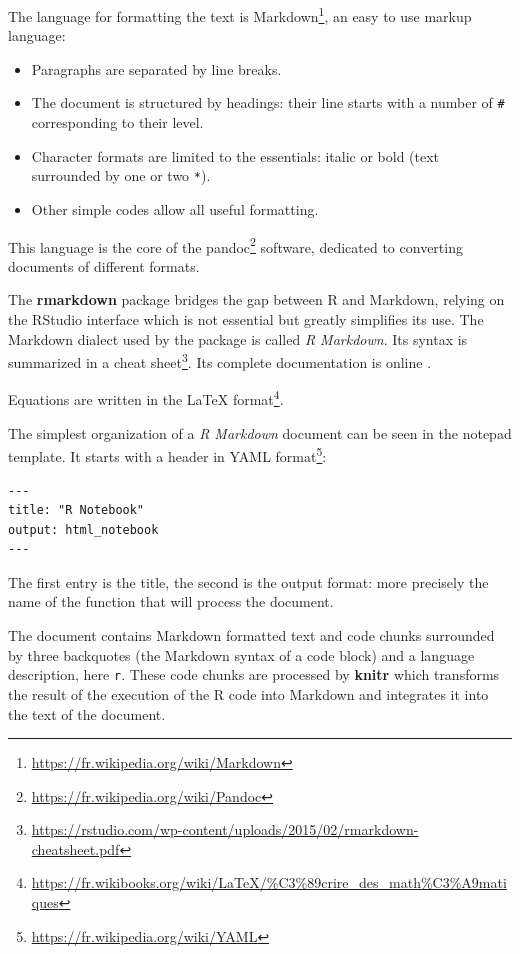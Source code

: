\documentclass[
  12pt,
  american,
  a4paper,
  extrafontsizes,onecolumn,openright
  ]{memoir}
\providecommand{\tightlist}{%
  \setlength{\itemsep}{0pt}\setlength{\parskip}{0pt}}
\newlength{\rf}
\begin{document}
The language for formatting the text is Markdown\footnote{\url{https://fr.wikipedia.org/wiki/Markdown}}, an easy to use markup language:

\begin{itemize}
\tightlist
\item
  Paragraphs are separated by line breaks.
\item
  The document is structured by headings: their line starts with a number of \texttt{\#} corresponding to their level.
\item
  Character formats are limited to the essentials: italic or bold (text surrounded by one or two \texttt{*}).
\item
  Other simple codes allow all useful formatting.
\end{itemize}

This language is the core of the pandoc\footnote{\url{https://fr.wikipedia.org/wiki/Pandoc}} software, dedicated to converting documents of different formats.

The \textbf{rmarkdown} package \autocite{Xie2015} bridges the gap between R and Markdown, relying on the RStudio interface which is not essential but greatly simplifies its use.
The Markdown dialect used by the package is called \emph{R Markdown}.
Its syntax is summarized in a cheat sheet\footnote{\url{https://rstudio.com/wp-content/uploads/2015/02/rmarkdown-cheatsheet.pdf}}.
Its complete documentation is online \autocite{Xie2018}.

Equations are written in the LaTeX format\footnote{\url{https://fr.wikibooks.org/wiki/LaTeX/\%C3\%89crire_des_math\%C3\%A9matiques}}.

The simplest organization of a \emph{R Markdown} document can be seen in the notepad template.
It starts with a header in YAML format\footnote{\url{https://fr.wikipedia.org/wiki/YAML}}:

\begin{verbatim}
---
title: "R Notebook"
output: html_notebook
---
\end{verbatim}

The first entry is the title, the second is the output format: more precisely the name of the function that will process the document.

The document contains Markdown formatted text and code chunks surrounded by three backquotes (the Markdown syntax of a code block) and a language description, here \texttt{r}.
These code chunks are processed by \textbf{knitr} which transforms the result of the execution of the R code into Markdown and integrates it into the text of the document.
\end{document}
